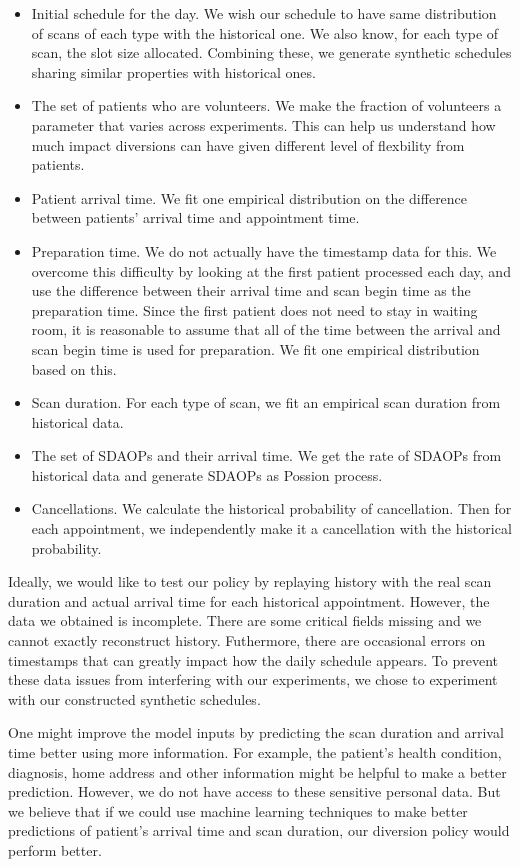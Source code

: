 \begin{itemize}
\item Initial schedule for the day. We wish our schedule to have
  same distribution of scans of each type with the historical one.
  We also know, for each type of scan, the slot size allocated.
  Combining these, we generate synthetic schedules sharing similar
  properties with historical ones.
\item The set of patients who are volunteers. We make the fraction
  of volunteers a parameter that varies across experiments.
  This can help us understand how much impact diversions can have
  given different level of flexbility from patients.
\item Patient arrival time. We fit one empirical distribution on
  the difference between patients' arrival time and appointment time.
\item Preparation time. We do not actually have the timestamp data for this.
  We overcome this difficulty by looking at the first patient processed each day,
  and use the difference between their arrival time and scan begin time
  as the preparation time. Since the first patient does not need to stay in
  waiting room, it is reasonable to assume that all of the time between the arrival
  and scan begin time is used for preparation. We fit one empirical distribution
  based on this.
\item Scan duration. For each type of scan, we fit an empirical
  scan duration from historical data.
\item The set of SDAOPs and their arrival time. We get the rate of
  SDAOPs from historical data and generate SDAOPs as Possion process.
\item Cancellations. We calculate the historical probability of cancellation.
  Then for each appointment, we independently make it a cancellation with
  the historical probability.
\end{itemize}
Ideally, we would like to test our policy by replaying history with the real
scan duration and actual arrival time for each historical appointment. However,
the data we obtained is incomplete. There are some critical fields missing
and we cannot exactly reconstruct history. Futhermore, there are occasional
errors on timestamps that can greatly impact how the daily schedule appears.
To prevent these data issues from interfering with our experiments, we chose
to experiment with our constructed synthetic schedules.

One might improve the model inputs by predicting the scan duration and
arrival time better using more information. For example, the patient's
health condition, diagnosis, home address and other information might be
helpful to make a better prediction. However, we do not have access to these
sensitive personal data. But we believe that if we could use machine learning
techniques to make better predictions of patient's arrival time and scan duration,
our diversion policy would perform better.


